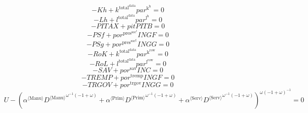 \begin{equation}
-{K\!h} + {k^{\mathrm{total}^{\mathrm{data}}}} {{p\!a\!r}^{\mathrm{k}^{\mathrm{h}}}} = 0
\end{equation}
\begin{equation}
-{L\!h} + {l^{\mathrm{total}^{\mathrm{data}}}} {{p\!a\!r}^{\mathrm{l}^{\mathrm{h}}}} = 0
\end{equation}
\begin{equation}
-{P\!I\!T\!A\!X} + {{p\!i\!t}} {{P\!I\!T\!B}} = 0
\end{equation}
\begin{equation}
-{P\!S\!f} + {{p\!o\!r}^{\mathrm{pres}^{\mathrm{soc}^{\mathrm{f}}}}} {{I\!N\!G\!F}} = 0
\end{equation}
\begin{equation}
-{P\!S\!g} + {{p\!o\!r}^{\mathrm{pres}^{\mathrm{soc}^{\mathrm{g}}}}} {{I\!N\!G\!G}} = 0
\end{equation}
\begin{equation}
-{R\!o\!K} + {k^{\mathrm{total}^{\mathrm{data}}}} {{p\!a\!r}^{\mathrm{k}^{\mathrm{row}}}} = 0
\end{equation}
\begin{equation}
-{R\!o\!L} + {l^{\mathrm{total}^{\mathrm{data}}}} {{p\!a\!r}^{\mathrm{l}^{\mathrm{row}}}} = 0
\end{equation}
\begin{equation}
-{S\!A\!V} + {{p\!o\!r}^{\mathrm{sav}}} {{I\!N\!C}} = 0
\end{equation}
\begin{equation}
-{T\!R\!E\!M\!P} + {{p\!o\!r}^{\mathrm{tremp}}} {{I\!N\!G\!F}} = 0
\end{equation}
\begin{equation}
-{T\!R\!G\!O\!V} + {{p\!o\!r}^{\mathrm{trgov}}} {{I\!N\!G\!G}} = 0
\end{equation}
\begin{equation}
U - \left({{\alpha}^{\langle \mathrm{\mathrm{Manu}}\rangle}} {{{D}^{\langle \mathrm{Manu}\rangle}}^{{\omega}^{-1} \left(-1 + \omega\right)}} + {{\alpha}^{\langle \mathrm{\mathrm{Prim}}\rangle}} {{{D}^{\langle \mathrm{Prim}\rangle}}^{{\omega}^{-1} \left(-1 + \omega\right)}} + {{\alpha}^{\langle \mathrm{\mathrm{Serv}}\rangle}} {{{D}^{\langle \mathrm{Serv}\rangle}}^{{\omega}^{-1} \left(-1 + \omega\right)}}\right)^{{\omega} \left(-1 + \omega\right)^{-1}} = 0
\end{equation}
